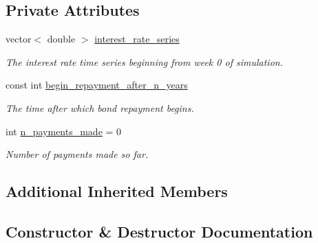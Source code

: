 \subsection*{Private Attributes}
\begin{DoxyCompactItemize}
\item 
vector$<$ double $>$ \mbox{\hyperlink{classFloatingInterestBalloonPaymentBond_a36c73466753c976e513c6763f79f58ad}{interest\+\_\+rate\+\_\+series}}
\begin{DoxyCompactList}\small\item\em The interest rate time series beginning from week 0 of simulation. \end{DoxyCompactList}\item 
const int \mbox{\hyperlink{classFloatingInterestBalloonPaymentBond_a439428fff4f2d4ba5d0b593e5d30687f}{begin\+\_\+repayment\+\_\+after\+\_\+n\+\_\+years}}
\begin{DoxyCompactList}\small\item\em The time after which bond repayment begins. \end{DoxyCompactList}\item 
int \mbox{\hyperlink{classFloatingInterestBalloonPaymentBond_afc1a77eb5d799201c7ef5c52ef5df374}{n\+\_\+payments\+\_\+made}} = 0
\begin{DoxyCompactList}\small\item\em Number of payments made so far. \end{DoxyCompactList}\end{DoxyCompactItemize}
\subsection*{Additional Inherited Members}


\subsection{Constructor \& Destructor Documentation}
\mbox{\label{classFloatingInterestBalloonPaymentBond_aa42f50447a3dd1bd6959e8c4bd0c2421}} 

